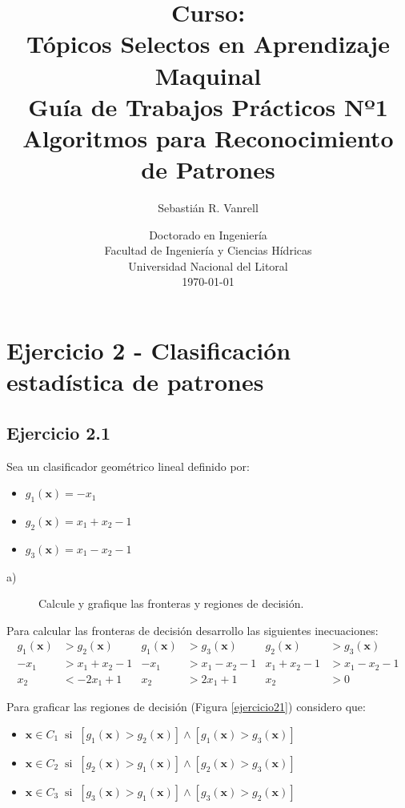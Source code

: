 \documentclass[11pt,a4paper,final]{article}
\author{Sebastián R. Vanrell\\[3em]}
\title{{\large Curso:}\\\medskip
       {\Large Tópicos Selectos en Aprendizaje Maquinal}\\[3em]
       \textsf{Guía de Trabajos Prácticos Nº1}\\\bigskip
       \textsf{Algoritmos para Reconocimiento de Patrones}\\[3em]}
\date{Doctorado en Ingeniería\\\bigskip
      Facultad de Ingeniería y Ciencias Hídricas\\\bigskip
      Universidad Nacional del Litoral \\[5em]
      \today}
\begin{document}
\renewcommand{\tablename}{Tabla}

\maketitle
\newpage

\tableofcontents

\newpage

\section{Ejercicio 2 - Clasificación estadística de patrones}

\subsection{Ejercicio 2.1}

Sea un clasificador geométrico lineal definido por:
\begin{itemize}
\item $g_1(\mathbf{x}) = - x_1$ 
\item $g_2(\mathbf{x}) = x_1 + x_2 - 1$
\item $g_3(\mathbf{x}) = x_1 - x_2 - 1$
\end{itemize}

\begin{description}
\item[a)] Calcule y grafique las fronteras y regiones de decisión.
\end{description}

Para calcular las fronteras de decisión desarrollo las siguientes inecuaciones:
\begin{align*}
g_1(\mathbf{x}) &> g_2(\mathbf{x})   &  g_1(\mathbf{x}) &> g_3(\mathbf{x})  &  g_2(\mathbf{x}) &> g_3(\mathbf{x}) \\
- x_1           &> x_1 + x_2 - 1     &  - x_1           &> x_1 - x_2 - 1    &  x_1 + x_2 - 1   &> x_1 - x_2 - 1   \\
  x_2           &< - 2 x_1 + 1       &  x_2             &> 2 x_1 + 1        &  x_2             &> 0
\end{align*}

Para graficar las regiones de decisión (Figura \ref{ejercicio21}) considero que:
\begin{itemize}
\item $\mathbf{x} \in C_1 \;\; \mathrm{si} \;\; [g_1(\mathbf{x}) > g_2(\mathbf{x})] \wedge  [g_1(\mathbf{x}) > g_3(\mathbf{x})]$

\item $\mathbf{x} \in C_2 \;\; \mathrm{si} \;\; [g_2(\mathbf{x}) > g_1(\mathbf{x})] \wedge  [g_2(\mathbf{x}) > g_3(\mathbf{x})]$

\item $\mathbf{x} \in C_3 \;\; \mathrm{si} \;\; [g_3(\mathbf{x}) > g_1(\mathbf{x})] \wedge  [g_3(\mathbf{x}) > g_2(\mathbf{x})]$
\end{itemize}
\end{document}
